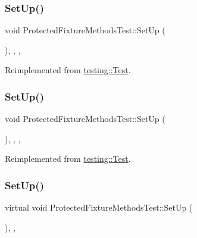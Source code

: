 \subsubsection{\texorpdfstring{SetUp()}{SetUp()}\hspace{0.1cm}{\footnotesize\ttfamily [1/3]}}
{\footnotesize\ttfamily void Protected\+Fixture\+Methods\+Test\+::\+Set\+Up (\begin{DoxyParamCaption}{ }\end{DoxyParamCaption})\hspace{0.3cm}{\ttfamily [inline]}, {\ttfamily [override]}, {\ttfamily [protected]}, {\ttfamily [virtual]}}



Reimplemented from \mbox{\hyperlink{classtesting_1_1_test_a190315150c303ddf801313fd1a777733}{testing\+::\+Test}}.

\mbox{\label{class_protected_fixture_methods_test_a9d68d51c945c3f810cc2ab76e71ecb95}} 
\subsubsection{\texorpdfstring{SetUp()}{SetUp()}\hspace{0.1cm}{\footnotesize\ttfamily [2/3]}}
{\footnotesize\ttfamily void Protected\+Fixture\+Methods\+Test\+::\+Set\+Up (\begin{DoxyParamCaption}{ }\end{DoxyParamCaption})\hspace{0.3cm}{\ttfamily [inline]}, {\ttfamily [override]}, {\ttfamily [protected]}, {\ttfamily [virtual]}}



Reimplemented from \mbox{\hyperlink{classtesting_1_1_test_a190315150c303ddf801313fd1a777733}{testing\+::\+Test}}.

\mbox{\label{class_protected_fixture_methods_test_a5184c708ac89cfb69f0e4c742e93398a}} 
\subsubsection{\texorpdfstring{SetUp()}{SetUp()}\hspace{0.1cm}{\footnotesize\ttfamily [3/3]}}
{\footnotesize\ttfamily virtual void Protected\+Fixture\+Methods\+Test\+::\+Set\+Up (\begin{DoxyParamCaption}{ }\end{DoxyParamCaption})\hspace{0.3cm}{\ttfamily [inline]}, {\ttfamily [protected]}, {\ttfamily [virtual]}}



